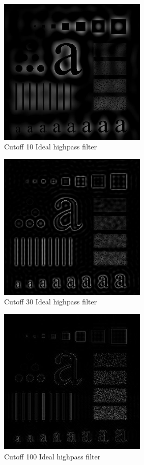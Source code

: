 \documentclass[10pt]{article}
\begin{document}
\begin{figure}[!ht]
	\centering
	\includegraphics[height=200pt]{./ex3/ch_ideal_high_10.jpg}
	\caption{Cutoff 10 Ideal highpass filter}
\end{figure}
\begin{figure}[!ht]
	\centering
	\includegraphics[height=200pt]{./ex3/ch_ideal_high_30.jpg}
	\caption{Cutoff 30 Ideal highpass filter}
\end{figure}
\begin{figure}[!ht]
	\centering
	\includegraphics[height=200pt]{./ex3/ch_ideal_high_100.jpg}
	\caption{Cutoff 100 Ideal highpass filter}
\end{figure}
\clearpage
\end{document}
